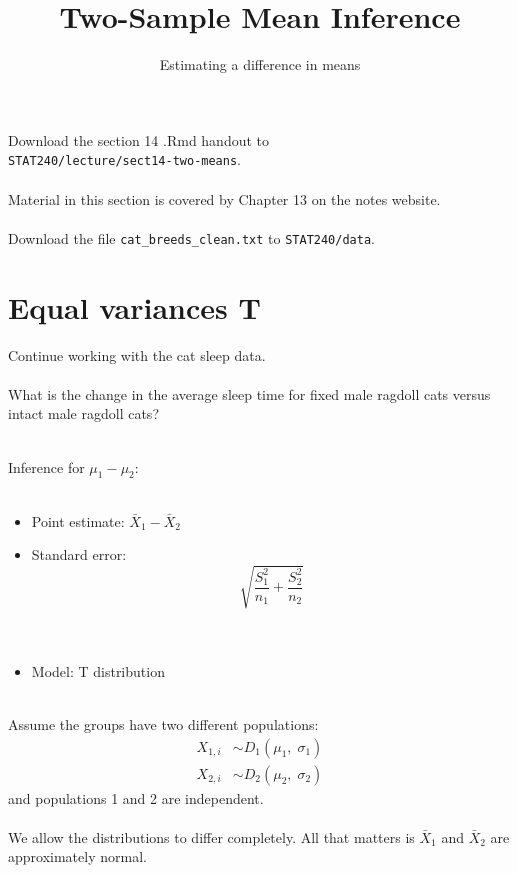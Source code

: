 \documentclass[xcolor={dvipsnames,svgnames},14pt]{beamer}
\title{Two-Sample Mean Inference}
\date{}
\subtitle{Estimating a difference in means}
\begin{document}
\frame{\titlepage}

\begin{frame}
Download the section 14 .Rmd handout to \\ 
\texttt{STAT240/lecture/sect14-two-means}. \\~\\

Material in this section is covered by Chapter 13 on
the notes website.
\\~\\

Download the file \texttt{cat\_breeds\_clean.txt} to \texttt{STAT240/data}.
\end{frame}

\section{Equal variances T}

\begin{frame}
Continue working with the cat sleep data. \\~\\

What is the change in the average sleep time for fixed male ragdoll cats versus intact male ragdoll cats? \\~\\
\end{frame}

\begin{frame}
Inference for $\mu_1 - \mu_2$: \\~\\ \begin{itemize}
\item Point estimate: $\bar{X}_1 - \bar{X}_2$
\item Standard error:
$$\sqrt{\frac{S^2_1}{n_1} + \frac{S^2_2}{n_2}}$$ 
\\~\\
\item Model: T distribution \\~\\
\end{itemize}
\end{frame}

\begin{frame}
Assume the groups have two different populations: \begin{align*}
X_{1,i} & \sim D_1(\mu_1,\; \sigma_1) \\
X_{2,i} & \sim D_2(\mu_2,\; \sigma_2)
\end{align*}
and populations 1 and 2 are independent. \\~\\
We allow the distributions to differ completely.  All that matters is $\bar{X}_1$ and $\bar{X}_2$ are approximately normal.
\end{frame}
\end{document}

